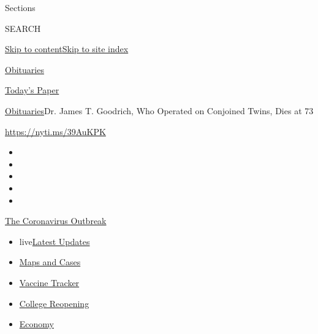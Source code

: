 Sections

SEARCH

\protect\hyperlink{site-content}{Skip to
content}\protect\hyperlink{site-index}{Skip to site index}

\href{https://www.nytimes3xbfgragh.onion/section/obituaries}{Obituaries}

\href{https://myaccount.nytimes3xbfgragh.onion/auth/login?response_type=cookie\&client_id=vi}{}

\href{https://www.nytimes3xbfgragh.onion/section/todayspaper}{Today's
Paper}

\href{/section/obituaries}{Obituaries}\textbar{}Dr. James T. Goodrich,
Who Operated on Conjoined Twins, Dies at 73

\url{https://nyti.ms/39AuKPK}

\begin{itemize}
\item
\item
\item
\item
\item
\end{itemize}

\href{https://www.nytimes3xbfgragh.onion/news-event/coronavirus?action=click\&pgtype=Article\&state=default\&region=TOP_BANNER\&context=storylines_menu}{The
Coronavirus Outbreak}

\begin{itemize}
\tightlist
\item
  live\href{https://www.nytimes3xbfgragh.onion/2020/08/04/world/coronavirus-covid-19.html?action=click\&pgtype=Article\&state=default\&region=TOP_BANNER\&context=storylines_menu}{Latest
  Updates}
\item
  \href{https://www.nytimes3xbfgragh.onion/interactive/2020/us/coronavirus-us-cases.html?action=click\&pgtype=Article\&state=default\&region=TOP_BANNER\&context=storylines_menu}{Maps
  and Cases}
\item
  \href{https://www.nytimes3xbfgragh.onion/interactive/2020/science/coronavirus-vaccine-tracker.html?action=click\&pgtype=Article\&state=default\&region=TOP_BANNER\&context=storylines_menu}{Vaccine
  Tracker}
\item
  \href{https://www.nytimes3xbfgragh.onion/2020/08/02/us/covid-college-reopening.html?action=click\&pgtype=Article\&state=default\&region=TOP_BANNER\&context=storylines_menu}{College
  Reopening}
\item
  \href{https://www.nytimes3xbfgragh.onion/live/2020/08/03/business/stock-market-today-coronavirus?action=click\&pgtype=Article\&state=default\&region=TOP_BANNER\&context=storylines_menu}{Economy}
\end{itemize}

